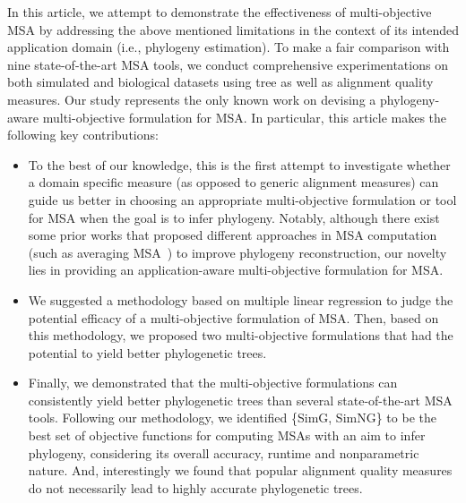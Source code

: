 In this article, we attempt to demonstrate the effectiveness of multi-objective MSA by addressing the above mentioned limitations in the context of its intended application domain (i.e., phylogeny estimation).
To make a fair comparison with nine state-of-the-art MSA tools, we conduct comprehensive experimentations on both simulated and biological datasets using tree as well as alignment quality measures. 
Our study represents the only known work on devising a phylogeny-aware multi-objective formulation for MSA. In particular, this article makes the following key contributions:
\begin{itemize}
	\item To the best of our knowledge, this is the first attempt to investigate whether a domain specific measure (as opposed to generic alignment measures) can guide us better in choosing an appropriate multi-objective formulation or tool for MSA when the goal is to infer phylogeny. Notably, although there exist some prior works that proposed different approaches in MSA computation (such as averaging MSA~\citep{ashkenazy2018multiple}) to improve phylogeny reconstruction, our novelty lies in providing an application-aware multi-objective formulation for MSA.
	
	\item We suggested a methodology based on multiple linear regression to judge the potential efficacy of a multi-objective formulation of MSA. Then, based on this methodology, we proposed two multi-objective formulations that had the potential to yield better phylogenetic trees.
	
	\item Finally, we demonstrated that the multi-objective formulations can consistently yield better phylogenetic trees than several state-of-the-art MSA tools. Following our methodology, we identified \{SimG, SimNG\} to be the best set of objective functions for computing MSAs with an aim to infer phylogeny, considering its overall accuracy, runtime and nonparametric nature. And, interestingly we found that popular alignment quality measures do not necessarily lead to highly accurate phylogenetic trees. 
	

\end{itemize}
